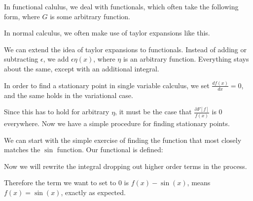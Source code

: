 \documentclass[12pt]{article}
\begin{document}
In functional calulus, we deal with functionals, which often take the following form, where $G$ is some arbitrary function.


In normal calculus, we often make use of taylor expansions like this.


We can extend the idea of taylor expansions to functionals. Instead of adding or subtracting $\epsilon$, we add $\epsilon \eta(x)$, where $\eta$ is an arbitrary function. Everything stays about the same, except with an additional integral. 


In order to find a stationary point in single variable calculus, we set $\frac{df(x)}{dx} = 0$, and the same holds in the variational case.


Since this has to hold for arbitrary $\eta$, it must be the case that $\frac{\partial F[f]}{f(x)}$ is 0 everywhere. Now we have a simple procedure for finding stationary points.



We can start with the simple exercise of finding the function that most closely matches the $\sin$ function. Our functional is defined:


Now we will rewrite the integral dropping out higher order terms in the process.


Therefore the term we want to set to 0 is $f(x)-\sin(x)$, means $f(x) = \sin(x)$, exactly as expected.
\end{document}
